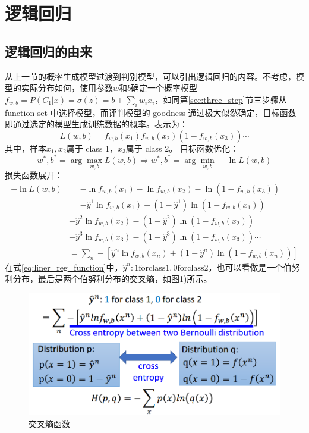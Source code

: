 \section{逻辑回归}
\subsection{逻辑回归的由来}
从上一节的概率生成模型过渡到判别模型，可以引出逻辑回归的内容。不考虑，模型的实际分布如何，使用参数$w$和$b$确定一个概率模型$f_{w,b}=P(C_1|x)=\sigma(z)=b+\sum_i w_i x_i$，如同第\ref{sec:three_step}节三步骤从 function set 中选择模型，而评判模型的 goodness 通过极大似然确定，目标函数即通过选定的模型生成训练数据的概率。表示为：
\begin{equation}
L(w,b)=f_{w,b}(x_1)f_{w,b}(x_2)(1-f_{w,b}(x_3)) \cdots
\end{equation}
其中，样本$x_1,x_2$属于 class 1，$x_3$属于 class 2。
目标函数优化：
\begin{equation}
w^*,b^* = \arg \max_{w,b} L(w,b) \Rightarrow w^*,b^* = \arg \min_{w,b} -\ln L(w,b)
\end{equation}
损失函数展开：
\begin{align}\label{eq:liner_reg_function}
-\ln L(w,b) &= -\ln f_{w,b}(x_1) -\ln f_{w,b}(x_2) - \ln (1-f_{w,b}(x_3))\\
			&= -\hat{y}^1 \ln f_{w,b}(x_1) - (1-\hat{y}^1) \ln (1-f_{w,b}(x_1))\\
			&-\hat{y}^2 \ln f_{w,b}(x_2) - (1-\hat{y}^2) \ln (1-f_{w,b}(x_2))\\
			&-\hat{y}^3 \ln f_{w,b}(x_3) - (1-\hat{y}^3) \ln (1-f_{w,b}(x_3))\cdots\\ 
			&=\sum_n -\left[ \hat{y}^n \ln f_{w,b}(x_n) + (1-\hat{y}^n) \ln (1-f_{w,b}(x_n))
			\right]
\end{align}
在式\eqref{eq:liner_reg_function}中，$\hat{y}^n: \mathrm{1 for class1, 0 for class2}$，也可以看做是一个伯努利分布，最后是两个伯努利分布的交叉熵，如图\ref{fig:cross_entropy})所示。
\begin{figure}[htb]
	\centering
	\includegraphics[scale=0.4]{pic/cross_entropy_bernoulli}
	\caption{交叉熵函数}
	\label{fig:cross_entropy}
\end{figure}
